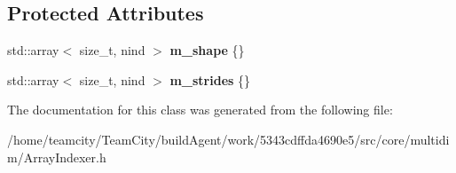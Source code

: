\subsection*{Protected Attributes}
\begin{DoxyCompactItemize}
\item 
std\+::array$<$ size\+\_\+t, nind $>$ {\bfseries m\+\_\+shape} \{\}\hypertarget{classArrayIndexer_ae9f32843d8e8cb73a1d6034be9ea45fb}{}\label{classArrayIndexer_ae9f32843d8e8cb73a1d6034be9ea45fb}

\item 
std\+::array$<$ size\+\_\+t, nind $>$ {\bfseries m\+\_\+strides} \{\}\hypertarget{classArrayIndexer_a6462c050c22291cdc1e76ff7ece5e918}{}\label{classArrayIndexer_a6462c050c22291cdc1e76ff7ece5e918}

\end{DoxyCompactItemize}


The documentation for this class was generated from the following file\+:\begin{DoxyCompactItemize}
\item 
/home/teamcity/\+Team\+City/build\+Agent/work/5343cdffda4690e5/src/core/multidim/Array\+Indexer.\+h\end{DoxyCompactItemize}
